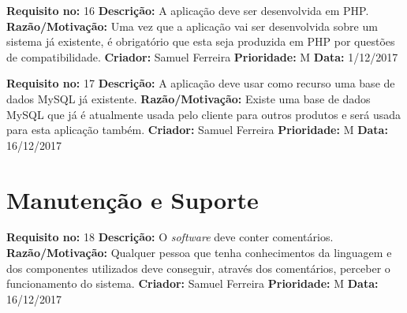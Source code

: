 \begin{framed}
\noindent\textbf{Requisito no:} 16
\vspace{2mm}
\newline\textbf{Descrição:} A aplicação deve ser desenvolvida em PHP.
\vspace{1mm}
\newline\textbf{Razão/Motivação:} Uma vez que a aplicação vai ser desenvolvida sobre um sistema já existente, é obrigatório que esta seja produzida em PHP por questões de compatibilidade.
\vspace{1mm}
\newline\textbf{Criador:} Samuel Ferreira
\vspace{1mm}
\newline\textbf{Prioridade:} M
\vspace{1mm}
\newline\textbf{Data:} 1/12/2017
\end{framed}

\begin{framed}
\noindent\textbf{Requisito no:} 17
\vspace{2mm}
\newline\textbf{Descrição:} A aplicação deve usar como recurso uma base de dados MySQL já existente.
\vspace{1mm}
\newline\textbf{Razão/Motivação:} Existe uma base de dados MySQL que já é atualmente usada pelo cliente para outros produtos e será usada para esta aplicação também.
\vspace{1mm}
\newline\textbf{Criador:} Samuel Ferreira
\vspace{1mm}
\newline\textbf{Prioridade:} M
\vspace{1mm}
\newline\textbf{Data:} 16/12/2017
\end{framed}

\newpage

\section{Manutenção e Suporte}

\begin{framed}
\noindent\textbf{Requisito no:} 18
\vspace{2mm}
\newline\textbf{Descrição:} O \emph{software} deve conter comentários.
\vspace{1mm}
\newline\textbf{Razão/Motivação:} Qualquer pessoa que tenha conhecimentos da linguagem e dos componentes utilizados deve conseguir, através  dos comentários, perceber o funcionamento do sistema.
\vspace{1mm}
\newline\textbf{Criador:} Samuel Ferreira
\vspace{1mm}
\newline\textbf{Prioridade:} M
\vspace{1mm}
\newline\textbf{Data:} 16/12/2017
\end{framed}

